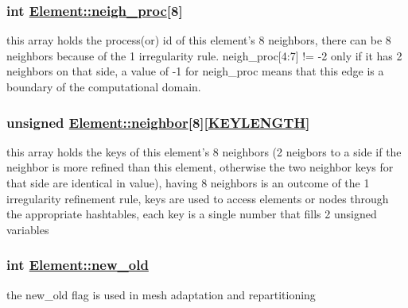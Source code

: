 \hypertarget{classElement_r11}{
\subsubsection[neigh\_\-proc]{\setlength{\rightskip}{0pt plus 5cm}int \hyperlink{classElement_r11}{Element::neigh\_\-proc}\mbox{[}8\mbox{]}}}
\label{classElement_r11}


this array holds the process(or) id of this element's 8 neighbors, there can be 8 neighbors because of the 1 irregularity rule. neigh\_\-proc\mbox{[}4:7\mbox{]} != -2 only if it has 2 neighbors on that side, a value of -1 for neigh\_\-proc means that this edge is a boundary of the computational domain. 

\hypertarget{classElement_r8}{
\subsubsection[neighbor]{\setlength{\rightskip}{0pt plus 5cm}unsigned \hyperlink{classElement_r8}{Element::neighbor}\mbox{[}8\mbox{]}\mbox{[}\hyperlink{constant_8h_a10}{KEYLENGTH}\mbox{]}}}
\label{classElement_r8}


this array holds the keys of this element's 8 neighbors (2 neigbors to a side if the neighbor is more refined than this element, otherwise the two neighbor keys for that side are identical in value), having 8 neighbors is an outcome of the 1 irregularity refinement rule, keys are used to access elements or nodes through the appropriate hashtables, each key is a single number that fills 2 unsigned variables 

\hypertarget{classElement_r22}{
\subsubsection[new\_\-old]{\setlength{\rightskip}{0pt plus 5cm}int \hyperlink{classElement_r22}{Element::new\_\-old}}}
\label{classElement_r22}


the new\_\-old flag is used in mesh adaptation and repartitioning 

